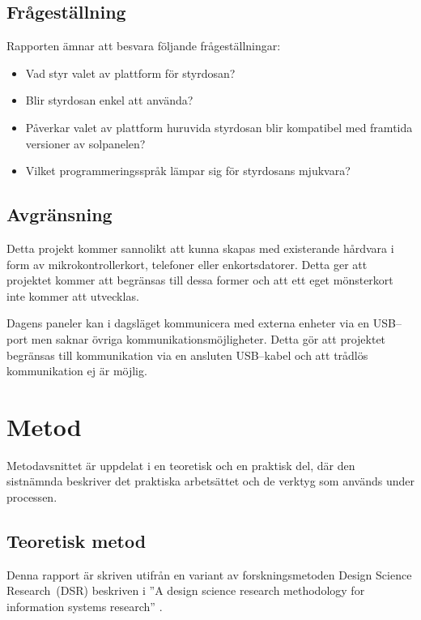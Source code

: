 \documentclass{article}
\begin{document}
        \subsection{Frågeställning} %
        \label{sub:fragestallning}
        Rapporten ämnar att besvara följande frågeställningar:
        \begin{itemize}
            \item Vad styr valet av plattform för styrdosan?
            \item Blir styrdosan enkel att använda?
            \item Påverkar valet av plattform huruvida styrdosan blir kompatibel med framtida versioner av solpanelen?
            \item Vilket programmeringsspråk lämpar sig för styrdosans mjukvara?
        \end{itemize}   
        


        \subsection{Avgränsning} %
        \label{sub:avgransning}
            Detta projekt kommer sannolikt att kunna skapas med existerande hårdvara i form av mikrokontrollerkort, telefoner eller enkortsdatorer. Detta ger att projektet kommer att begränsas till dessa former och att ett eget mönsterkort inte kommer att utvecklas.\bigskip

            \noindent Dagens paneler kan i dagsläget kommunicera med externa enheter via en USB--port men saknar övriga kommunikationsmöjligheter. Detta gör att projektet begränsas till kommunikation via en ansluten USB--kabel och att trådlös kommunikation ej är möjlig.

    \section{Metod} %
    \label{sec:metod}
        Metodavsnittet är uppdelat i en teoretisk och en praktisk del, där den sistnämnda be\-skriver det praktiska arbetsättet och de verktyg som används under processen.

        \subsection{Teoretisk metod} %
        \label{sub:teoretiskkmetod}
            Denna rapport är skriven utifrån en variant av forskningsmetoden Design Science Re\-\hbox{search }(DSR) beskriven i 
            ''A design science research methodology for information systems research'' \cite{method}. \bigskip
\end{document}
